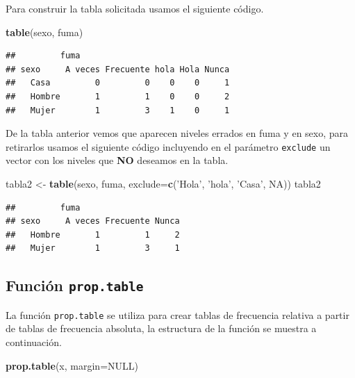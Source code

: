 \documentclass[10pt,]{krantz}
\makeatletter
\newenvironment{Shaded}{\begin{snugshade}}{\end{snugshade}}
\newcommand{\KeywordTok}[1]{\textcolor[rgb]{0.13,0.29,0.53}{\textbf{#1}}}
\newcommand{\DataTypeTok}[1]{\textcolor[rgb]{0.13,0.29,0.53}{#1}}
\newcommand{\StringTok}[1]{\textcolor[rgb]{0.31,0.60,0.02}{#1}}
\newcommand{\OtherTok}[1]{\textcolor[rgb]{0.56,0.35,0.01}{#1}}
\newcommand{\NormalTok}[1]{#1}
\newenvironment{kframe}{%
\medskip{}
\setlength{\fboxsep}{.8em}
 \def\at@end@of@kframe{}%
 \ifinner\ifhmode%
  \def\at@end@of@kframe{\end{minipage}}%
  \begin{minipage}{\columnwidth}%
 \fi\fi%
 \def\FrameCommand##1{\hskip\@totalleftmargin \hskip-\fboxsep
 \colorbox{shadecolor}{##1}\hskip-\fboxsep
     \hskip-\linewidth \hskip-\@totalleftmargin \hskip\columnwidth}%
 \MakeFramed {\advance\hsize-\width
   \@totalleftmargin\z@ \linewidth\hsize
   \@setminipage}}%
 {\par\unskip\endMakeFramed%
 \at@end@of@kframe}
\renewenvironment{Shaded}{\begin{kframe}}{\end{kframe}}
\makeatother
\begin{document}
Para construir la tabla solicitada usamos el siguiente código.

\begin{Shaded}
\begin{Highlighting}[]
\KeywordTok{table}\NormalTok{(sexo, fuma)}
\end{Highlighting}
\end{Shaded}

\begin{verbatim}
##         fuma
## sexo     A veces Frecuente hola Hola Nunca
##   Casa         0         0    0    0     1
##   Hombre       1         1    0    0     2
##   Mujer        1         3    1    0     1
\end{verbatim}

De la tabla anterior vemos que aparecen niveles errados en fuma y en
sexo, para retirarlos usamos el siguiente código incluyendo en el
parámetro \texttt{exclude} un vector con los niveles que \textbf{NO}
deseamos en la tabla.

\begin{Shaded}
\begin{Highlighting}[]
\NormalTok{tabla2 <-}\StringTok{ }\KeywordTok{table}\NormalTok{(sexo, fuma, }\DataTypeTok{exclude=}\KeywordTok{c}\NormalTok{(}\StringTok{'Hola'}\NormalTok{, }\StringTok{'hola'}\NormalTok{, }\StringTok{'Casa'}\NormalTok{, }\OtherTok{NA}\NormalTok{))}
\NormalTok{tabla2}
\end{Highlighting}
\end{Shaded}

\begin{verbatim}
##         fuma
## sexo     A veces Frecuente Nunca
##   Hombre       1         1     2
##   Mujer        1         3     1
\end{verbatim}

\subsection{\texorpdfstring{Función \texttt{prop.table}
}{Función prop.table }}\label{funcion-prop.table}

La función \texttt{prop.table} se utiliza para crear tablas de
frecuencia relativa a partir de tablas de frecuencia absoluta, la
estructura de la función se muestra a continuación.

\begin{Shaded}
\begin{Highlighting}[]
\KeywordTok{prop.table}\NormalTok{(x, }\DataTypeTok{margin=}\OtherTok{NULL}\NormalTok{)}
\end{Highlighting}
\end{Shaded}
\end{document}
